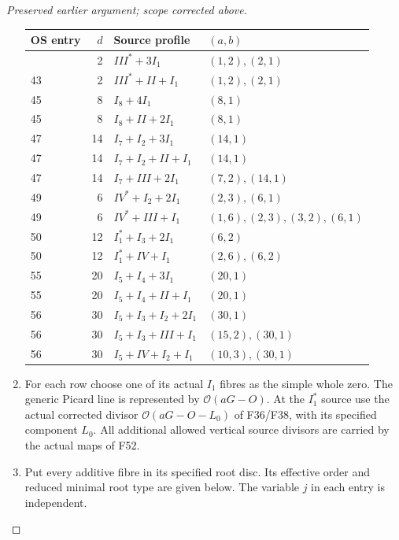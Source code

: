 \begin{proof}[Preserved earlier argument; scope corrected above]
\begin{enumerate}[label=\arabic*.]
\begin{longtable}[]{@{}lrll@{}}
\toprule\noalign{}
OS entry & \(d\) & Source profile & \((a,b)\) \\
\midrule\noalign{}
\endhead
\bottomrule\noalign{}
\endlastfoot
43 & 2 & \(III^*+3I_1\) & \((1,2),(2,1)\) \\
43 & 2 & \(III^*+II+I_1\) & \((1,2),(2,1)\) \\
45 & 8 & \(I_8+4I_1\) & \((8,1)\) \\
45 & 8 & \(I_8+II+2I_1\) & \((8,1)\) \\
47 & 14 & \(I_7+I_2+3I_1\) & \((14,1)\) \\
47 & 14 & \(I_7+I_2+II+I_1\) & \((14,1)\) \\
47 & 14 & \(I_7+III+2I_1\) & \((7,2),(14,1)\) \\
49 & 6 & \(IV^*+I_2+2I_1\) & \((2,3),(6,1)\) \\
49 & 6 & \(IV^*+III+I_1\) & \((1,6),(2,3),(3,2),(6,1)\) \\
50 & 12 & \(I_1^*+I_3+2I_1\) & \((6,2)\) \\
50 & 12 & \(I_1^*+IV+I_1\) & \((2,6),(6,2)\) \\
55 & 20 & \(I_5+I_4+3I_1\) & \((20,1)\) \\
55 & 20 & \(I_5+I_4+II+I_1\) & \((20,1)\) \\
56 & 30 & \(I_5+I_3+I_2+2I_1\) & \((30,1)\) \\
56 & 30 & \(I_5+I_3+III+I_1\) & \((15,2),(30,1)\) \\
56 & 30 & \(I_5+IV+I_2+I_1\) & \((10,3),(30,1)\) \\
\end{longtable}

\item For each row choose one of its actual \(I_1\) fibres as the simple
whole zero. The generic Picard line is represented by
\(\mathcal O(aG-O)\). At the \(I_1^*\) source use the actual
corrected divisor \(\mathcal O(aG-O-L_0)\) of F36/F38, with its
specified component \(L_0\). All additional allowed vertical
source divisors are carried by the actual maps of F52.

\item Put every additive fibre in its specified root disc. Its
effective order and reduced minimal root type are given below.
The variable \(j\) in each entry is independent.


\end{enumerate}
\end{proof}
